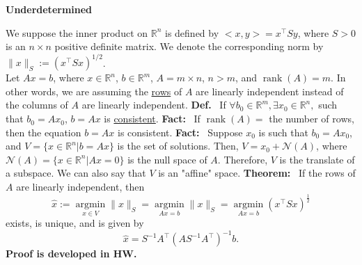 \documentclass[letterpaper]{article}
\newcommand{\real}{\mathbb R}  %
\begin{document}
\baselineskip=48pt  %


\setlength{\parskip}{.3in}
\setlength{\itemsep}{.3in}

\pagestyle{plain}



\Large

\begin{center}\textbf{Underdetermined}\end{center}

We suppose the inner product on $\real^n$ is defined by $<x,y> = x^\top Sy$, where $S>0$ is an $n\times n$ positive definite matrix. We denote the corresponding norm by $\|x\|_S := (x^\top S x)^{1/2}$. \\

        Let $Ax = b$, where $x \in \mathbb{R}^n$, $b\in \mathbb{R}^m$, $A=m\times n$, $n>m$, and $\operatorname{rank}(A)=m$. In other words, we are assuming the \underline{rows} of $A$ are linearly independent instead of the columns of $A$ are linearly independent.
        \newline\newline
        \textbf{Def.}~ If $\forall  b_0 \in \mathbb{R}^m, \exists  x_0 \in \mathbb{R}^n,$ such that $b_0 = Ax_0$, $b=Ax$ is \underline{consistent}.
        \newline\newline
        \textbf{Fact:}~ If $\operatorname{\operatorname{rank}}(A)=$ the number of rows, then the equation $b = Ax$ is consistent.
        \newline\newline
        \textbf{Fact:}~ Suppose $x_0$ is such that $b_0 = Ax_0$, and $V=\{x \in \mathbb{R}^n | b = Ax\}$ is the set of solutions. Then, $V = x_0 + \mathcal{N}(A)$, where $\mathcal{N}(A)=\{x \in \mathbb{R}^n | Ax=0\}$ is the null space of $A$. Therefore, $V$ is the translate of a subspace. We can also say that $V$ is an "affine" space.
        \newline\newline
        \textbf{Theorem:}~ If the rows of $A$ are linearly independent, then
        \begin{equation*}
            \hat{x} := \underset{ x \in V} {\operatorname{argmin}} \|x\|_S = \underset{ Ax=b} {\operatorname{argmin}} \|x\|_S = \underset{ Ax = b} {\operatorname{argmin}} (x^\top Sx)^{\frac{1}{2}}
        \end{equation*}
        exists, is unique,  and is given by
        \begin{equation*}
            \hat{x} = S^{-1} A^\top  \left(AS^{-1} A^\top \right)^{-1} b.
        \end{equation*}
        \textbf{Proof is developed in HW.}
\end{document}
